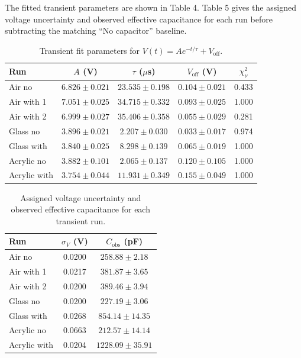 \documentclass[letterpaper,12pt]{article}
\begin{document}
The fitted transient parameters are shown in Table 4. Table 5 gives the assigned voltage uncertainty and observed effective capacitance for each run before subtracting the matching ``No capacitor'' baseline.

\begin{table}[H]
    \centering
    \caption{Transient fit parameters for $V(t)=Ae^{-t/\tau}+V_{\mathrm{off}}$.}
    \begin{tabular}{lcccc}
        \toprule
        Run & $A$ (V) & $\tau$ ($\mu$s) & $V_{\mathrm{off}}$ (V) & $\chi^2_\nu$ \\
        \midrule
        Air no & $6.826\pm0.021$ & $23.535\pm0.198$ & $0.104\pm0.021$ & 0.433 \\
        Air with 1 & $7.051\pm0.025$ & $34.715\pm0.332$ & $0.093\pm0.025$ & 1.000 \\
        Air with 2 & $6.999\pm0.027$ & $35.406\pm0.358$ & $0.055\pm0.029$ & 0.281 \\
        Glass no & $3.896\pm0.021$ & $2.207\pm0.030$ & $0.033\pm0.017$ & 0.974 \\
        Glass with & $3.840\pm0.025$ & $8.298\pm0.139$ & $0.065\pm0.019$ & 1.000 \\
        Acrylic no & $3.882\pm0.101$ & $2.065\pm0.137$ & $0.120\pm0.105$ & 1.000 \\
        Acrylic with & $3.754\pm0.044$ & $11.931\pm0.349$ & $0.155\pm0.049$ & 1.000 \\
        \bottomrule
    \end{tabular}
\end{table}

\begin{table}[H]
    \centering
    \caption{Assigned voltage uncertainty and observed effective capacitance for each transient run.}
    \begin{tabular}{lcc}
        \toprule
        Run & $\sigma_V$ (V) & $C_{\mathrm{obs}}$ (pF) \\
        \midrule
        Air no & 0.0200 & $258.88\pm2.18$ \\
        Air with 1 & 0.0217 & $381.87\pm3.65$ \\
        Air with 2 & 0.0200 & $389.46\pm3.94$ \\
        Glass no & 0.0200 & $227.19\pm3.06$ \\
        Glass with & 0.0268 & $854.14\pm14.35$ \\
        Acrylic no & 0.0663 & $212.57\pm14.14$ \\
        Acrylic with & 0.0204 & $1228.09\pm35.91$ \\
        \bottomrule
    \end{tabular}
\end{table}
\end{document}
